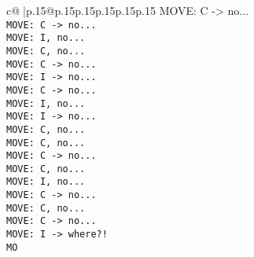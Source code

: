 \documentclass{article}
\begin{document}
{\begin{supertabular}{c@{$\;$}|p{.15\linewidth}@{}p{.15\linewidth}p{.15\linewidth}p{.15\linewidth}p{.15\linewidth}p{.15\linewidth}}
{{{ MOVE: C -> no...\\ \tt  MOVE: C -> no...\\ \tt  MOVE: I, no...\\ \tt  MOVE: C, no...\\ \tt  MOVE: C -> no...\\ \tt  MOVE: I -> no...\\ \tt  MOVE: C -> no...\\ \tt  MOVE: I, no...\\ \tt  MOVE: I -> no...\\ \tt  MOVE: C, no...\\ \tt  MOVE: C, no...\\ \tt  MOVE: C -> no...\\ \tt  MOVE: C, no...\\ \tt  MOVE: I, no...\\ \tt  MOVE: C -> no...\\ \tt  MOVE: C, no...\\ \tt  MOVE: C -> no...\\ \tt  MOVE: I -> where?!\\ \tt  MO}}}
\end{supertabular}}
\end{document}
